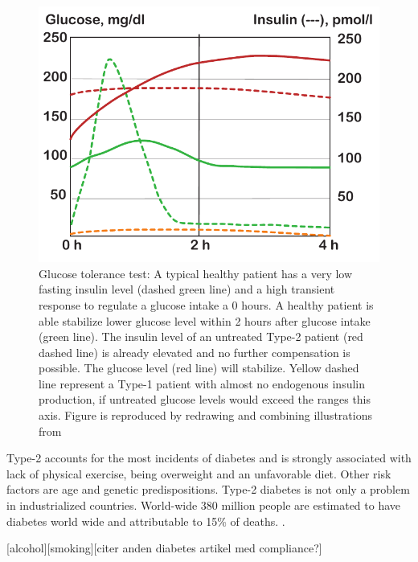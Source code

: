 \begin{figure}[h]
\label{intro_glucoseTolerance}
\includegraphics{graphics/glucoseTolerance.pdf}
\caption{Glucose tolerance test: A typical healthy patient has a very low fasting insulin level (dashed green line) and a high transient response to regulate a glucose intake a 0 hours. A healthy patient is able stabilize lower glucose level within 2 hours after glucose intake (green line). The insulin level of an untreated Type-2 patient (red dashed line) is already elevated and no further compensation is possible. The glucose level (red line) will stabilize. Yellow dashed line represent a Type-1 patient with almost no endogenous insulin production, if untreated glucose levels would exceed the ranges this axis. Figure is reproduced by redrawing and combining illustrations from \cite{silverthorn2010human,caumo2004first}}
\end{figure}

Type-2 accounts for the most incidents of diabetes and is strongly associated with lack of physical exercise, being overweight and an unfavorable diet. Other risk factors are age and genetic predispositions. Type-2 diabetes is not only a problem in industrialized countries.  World-wide 380 million people are estimated to have diabetes world wide and attributable to 15\% of deaths. \cite{aguiree2013idf}.

[alcohol][smoking][citer anden diabetes artikel med compliance?]

